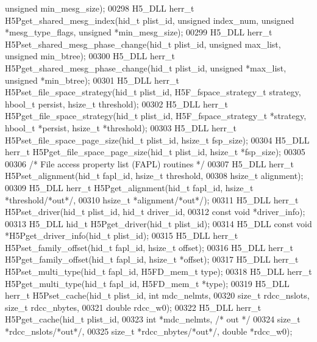 \begin{DoxyCode}
{      unsigned} min\_mesg\_size);
00298 H5\_DLL herr\_t H5Pget\_shared\_mesg\_index(hid\_t plist\_id, \textcolor{keywordtype}{unsigned} index\_num, \textcolor{keywordtype}{unsigned} *mesg\_type\_flags, \textcolor{keywordtype}{
      unsigned} *min\_mesg\_size);
00299 H5\_DLL herr\_t H5Pset\_shared\_mesg\_phase\_change(hid\_t plist\_id, \textcolor{keywordtype}{unsigned} max\_list, \textcolor{keywordtype}{unsigned} min\_btree);
00300 H5\_DLL herr\_t H5Pget\_shared\_mesg\_phase\_change(hid\_t plist\_id, \textcolor{keywordtype}{unsigned} *max\_list, \textcolor{keywordtype}{unsigned} *min\_btree);
00301 H5\_DLL herr\_t H5Pset\_file\_space\_strategy(hid\_t plist\_id, H5F\_fspace\_strategy\_t strategy, hbool\_t persist, 
      hsize\_t threshold);
00302 H5\_DLL herr\_t H5Pget\_file\_space\_strategy(hid\_t plist\_id, H5F\_fspace\_strategy\_t *strategy, hbool\_t *persist,
       hsize\_t *threshold);
00303 H5\_DLL herr\_t H5Pset\_file\_space\_page\_size(hid\_t plist\_id, hsize\_t fsp\_size);
00304 H5\_DLL herr\_t H5Pget\_file\_space\_page\_size(hid\_t plist\_id, hsize\_t *fsp\_size);
00305 
00306 \textcolor{comment}{/* File access property list (FAPL) routines */}
00307 H5\_DLL herr\_t H5Pset\_alignment(hid\_t fapl\_id, hsize\_t threshold,
00308     hsize\_t alignment);
00309 H5\_DLL herr\_t H5Pget\_alignment(hid\_t fapl\_id, hsize\_t *threshold\textcolor{comment}{/*out*/},
00310     hsize\_t *alignment\textcolor{comment}{/*out*/});
00311 H5\_DLL herr\_t H5Pset\_driver(hid\_t plist\_id, hid\_t driver\_id,
00312         \textcolor{keyword}{const} \textcolor{keywordtype}{void} *driver\_info);
00313 H5\_DLL hid\_t H5Pget\_driver(hid\_t plist\_id);
00314 H5\_DLL \textcolor{keyword}{const} \textcolor{keywordtype}{void} *H5Pget\_driver\_info(hid\_t plist\_id);
00315 H5\_DLL herr\_t H5Pset\_family\_offset(hid\_t fapl\_id, hsize\_t offset);
00316 H5\_DLL herr\_t H5Pget\_family\_offset(hid\_t fapl\_id, hsize\_t *offset);
00317 H5\_DLL herr\_t H5Pset\_multi\_type(hid\_t fapl\_id, H5FD\_mem\_t type);
00318 H5\_DLL herr\_t H5Pget\_multi\_type(hid\_t fapl\_id, H5FD\_mem\_t *type);
00319 H5\_DLL herr\_t H5Pset\_cache(hid\_t plist\_id, \textcolor{keywordtype}{int} mdc\_nelmts,
00320        \textcolor{keywordtype}{size\_t} rdcc\_nslots, \textcolor{keywordtype}{size\_t} rdcc\_nbytes,
00321        \textcolor{keywordtype}{double} rdcc\_w0);
00322 H5\_DLL herr\_t H5Pget\_cache(hid\_t plist\_id,
00323        \textcolor{keywordtype}{int} *mdc\_nelmts, \textcolor{comment}{/* out */}
00324        \textcolor{keywordtype}{size\_t} *rdcc\_nslots\textcolor{comment}{/*out*/},
00325        \textcolor{keywordtype}{size\_t} *rdcc\_nbytes\textcolor{comment}{/*out*/}, \textcolor{keywordtype}{double} *rdcc\_w0);

\end{DoxyCode}
